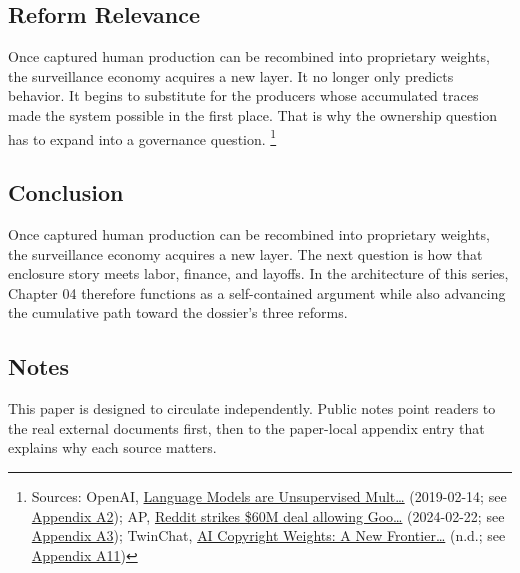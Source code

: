 \documentclass[
  american,
  11pt,
  letterpaper,
]{article}
\begin{document}
\subsection{Reform Relevance}\label{reform-relevance}

Once captured human production can be recombined into proprietary
weights, the surveillance economy acquires a new layer. It no longer
only predicts behavior. It begins to substitute for the producers whose
accumulated traces made the system possible in the first place. That is
why the ownership question has to expand into a governance question.
\footnote{Sources: OpenAI,
  \href{https://cdn.openai.com/better-language-models/language_models_are_unsupervised_multitask_learners.pdf}{Language
  Models are Unsupervised Mult\ldots{}} (2019-02-14; see
  \hyperref[appendix-a2-language-models-are-unsupervised-multitask-learners]{Appendix
  A2}); AP,
  \href{https://apnews.com/article/a7f131c7cb4225307134ef21d3c6a708}{Reddit
  strikes \$60M deal allowing Goo\ldots{}} (2024-02-22; see
  \hyperref[appendix-a3-reddit-strikes-60m-deal-allowing-google-to-train-ai-models-on-its-posts-unveils-ipo-plans]{Appendix
  A3}); TwinChat,
  \href{https://medium.com/twinchat/ai-copyright-weights-a-new-frontier-in-intellectual-property-law-d8ee1b6c55ee}{AI
  Copyright Weights: A New Frontier\ldots{}} (n.d.; see
  \hyperref[appendix-a11-ai-copyright-weights-a-new-frontier-in-intellectual-property-law]{Appendix
  A11})}

\subsection{Conclusion}\label{conclusion}

Once captured human production can be recombined into proprietary
weights, the surveillance economy acquires a new layer. The next
question is how that enclosure story meets labor, finance, and layoffs.
In the architecture of this series, Chapter 04 therefore functions as a
self-contained argument while also advancing the cumulative path toward
the dossier's three reforms.

\subsection{Notes}\label{notes}

This paper is designed to circulate independently. Public notes point
readers to the real external documents first, then to the paper-local
appendix entry that explains why each source matters.
\end{document}
